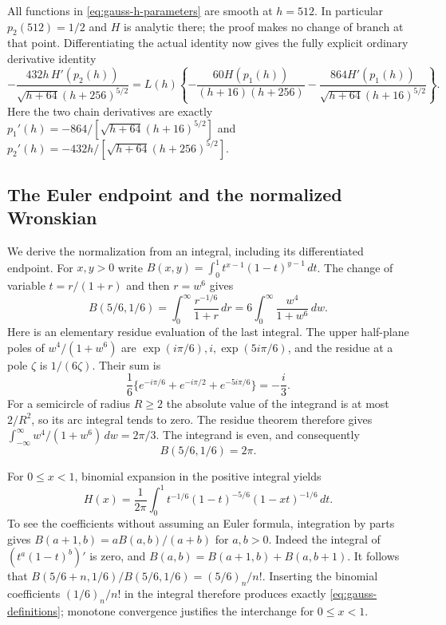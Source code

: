 \documentclass[11pt,a4paper]{article}
\begin{document}
All functions in \eqref{eq:gauss-h-parameters} are smooth at $h=512$.
In particular $p_2(512)=1/2$ and $H$ is analytic there; the proof makes
no change of branch at that point.  Differentiating the actual identity
now gives the fully explicit ordinary derivative identity
\begin{equation}\label{eq:gauss-actual-h-derivative}
 -\frac{432h\,H'(p_2(h))}{\sqrt{h+64}(h+256)^{5/2}}
 =L(h)\left\{
     -\frac{60H(p_1(h))}{(h+16)(h+256)}
     -\frac{864H'(p_1(h))}{\sqrt{h+64}(h+16)^{5/2}}
          \right\}.
\end{equation}
Here the two chain derivatives are exactly
$p_1'(h)=-864/[\sqrt{h+64}(h+16)^{5/2}]$ and
$p_2'(h)=-432h/[\sqrt{h+64}(h+256)^{5/2}]$.

\subsection{The Euler endpoint and the normalized Wronskian}

We derive the normalization from an integral, including its
differentiated endpoint.  For $x,y>0$ write
$B(x,y)=\int_0^1t^{x-1}(1-t)^{y-1}\,dt$.
The change of variable $t=r/(1+r)$ and then $r=w^6$ gives
\[
 B(5/6,1/6)=\int_0^\infty\frac{r^{-1/6}}{1+r}\,dr
                         =6\int_0^\infty\frac{w^4}{1+w^6}\,dw.
\]
Here is an elementary residue evaluation of the last integral.  The
upper half-plane poles of $w^4/(1+w^6)$ are
$\exp(i\pi/6),i,\exp(5i\pi/6)$, and the residue at a pole $\zeta$
is $1/(6\zeta)$.  Their sum is
\[
 \frac16\{e^{-i\pi/6}+e^{-i\pi/2}+e^{-5i\pi/6}\}
                         =-\frac i3.
\]
For a semicircle of radius $R\geq2$ the absolute value of the
integrand is at most $2/R^2$, so its arc integral tends to zero.
The residue theorem therefore gives
$\int_{-\infty}^{\infty}w^4/(1+w^6)\,dw=2\pi/3$.
The integrand is even, and consequently
\begin{equation}\label{eq:gauss-beta-normalization}
                              B(5/6,1/6)=2\pi.
\end{equation}

For $0\leq x<1$, binomial expansion in the positive integral yields
\begin{equation}\label{eq:gauss-euler-integral}
 H(x)=\frac1{2\pi}\int_0^1
       t^{-1/6}(1-t)^{-5/6}(1-xt)^{-1/6}\,dt.
\end{equation}
To see the coefficients without assuming an Euler formula, integration
by parts gives $B(a+1,b)=aB(a,b)/(a+b)$ for $a,b>0$.
Indeed the integral of $(t^a(1-t)^b)'$ is zero, and
$B(a,b)=B(a+1,b)+B(a,b+1)$.
It follows that
$B(5/6+n,1/6)/B(5/6,1/6)=(5/6)_n/n!$.
Inserting the binomial coefficients $(1/6)_n/n!$ in the integral
therefore produces exactly \eqref{eq:gauss-definitions}; monotone
convergence justifies the interchange for $0\leq x<1$.
\end{document}
